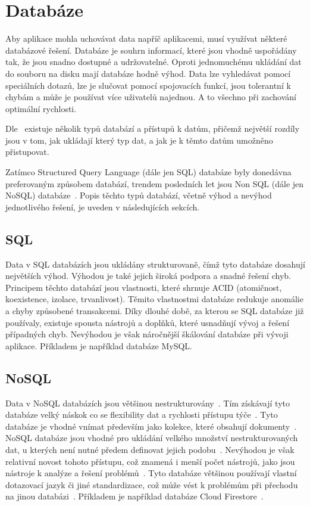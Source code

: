 \section{Databáze}

Aby aplikace mohla uchovávat data napříč aplikacemi,
musí využívat některé databázové řešení.
Databáze je souhrn informací,
které jsou vhodně uspořádány tak,
že jsou snadno dostupné a udržovatelné.
Oproti jednomuchému ukládání dat do souboru na disku mají databáze hodně výhod.
Data lze vyhledávat pomocí speciálních dotazů,
lze je slučovat pomocí spojovacích funkcí,
jsou tolerantní k chybám
a může je používat více uživatelů najednou.
A to všechno při zachování optimální rychlosti.~\cite{database}

Dle~\cite{sql_nosql} existuje několik typů databází a přístupů k datům,
přičemž největší rozdíly jsou v tom,
jak ukládají který typ dat,
a jak je k těmto datům umožněno přistupovat.
\emph{}~\cite{sql_nosql}

Zatímco Structured Query Language (dále jen SQL) databáze byly donedávna
preferovaným způsobem databází,
trendem posledních let jsou Non SQL (dále jen NoSQL) databáze~\cite{sql_nosql}.
Popis těchto typů databází,
včetně výhod a nevýhod jednotlivého řešení,
je uveden v následujících sekcích.

\subsection{SQL}

Data v SQL databázích jsou ukládány strukturovaně,
čímž tyto databáze dosahují největších výhod.
Výhodou je také jejich široká podpora a snadné řešení chyb.
Principem těchto databází jsou vlastnosti,
které shrnuje ACID (atomičnost, koexistence, izolace, trvanlivost).
Těmito vlastnostmi databáze redukuje anomálie a chyby způsobené transakcemi.
Díky dlouhé době,
za kterou se SQL databáze již používaly,
existuje spousta nástrojů a doplňků,
které usnadňují vývoj a řešení případných chyb.
Nevýhodou je však náročnější škálování databáze při vývoji aplikace.
Příkladem je například databáze MySQL.~\cite{sql_nosql}

\subsection{NoSQL}

Data v NoSQL databázích jsou většinou nestrukturovány~\cite{sql_nosql}.
Tím získávají tyto databáze velký náskok co se flexibility dat a rychlosti
přístupu týče~\cite{sql_nosql}.
Tyto databáze je vhodné vnímat především jako kolekce,
které obsahují dokumenty~\cite{sql_nosql}. 
NoSQL databáze jsou vhodné pro ukládání velkého množství nestrukturovaných dat,
u kterých není nutné předem definovat jejich podobu~\cite{sql_nosql}.
Nevýhodou je však relativní novost tohoto přístupu,
což znamená i menší počet nástrojů,
jako jsou nástroje k analýze a řešení problémů~\cite{sql_nosql}.
Tyto databáze většinou používají vlastní dotazovací jazyk či jiné standardizace,
což může vést k problémům při přechodu na jinou databázi~\cite{sql_nosql}.
Příkladem je například databáze Cloud Firestore~\cite{cloud_firestore}.

